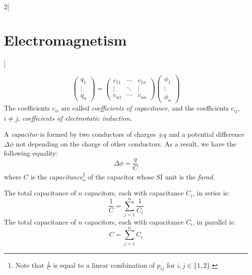\documentclass[../../../main_physics.tex]{subfiles}
\begin{document}
\begin{multicols}{2}[\section{Electromagnetism}]
\begin{definition}
    $$
      \begin{pmatrix}
        q_1    \\
        \vdots \\
        q_n
      \end{pmatrix}=
      \begin{pmatrix}
        c_{11} & \cdots & c_{1n} \\
        \vdots & \ddots & \vdots \\
        c_{n1} & \cdots & c_{nn}
      \end{pmatrix}
      \begin{pmatrix}
        \phi_1 \\
        \vdots \\
        \phi_n
      \end{pmatrix}
    $$
    The coefficients $c_{ii}$ are called \emph{coefficients of capacitance}, and the coefficients $c_{ij}$, $i\ne j$, \emph{coefficients of electrostatic induction}.
  \end{definition}
  \begin{definition}[Capacitor]
    A \emph{capacitor} is formed by two conductors of charges $\pm q$ and a potential difference $\Delta\phi$ not depending on the charge of other conductors. As a result, we have the following equality: $$\Delta\phi=\frac{q}{C}$$ where $C$ is the \emph{capacitance}\footnote{Note that $\frac{1}{C}$ is equal to a linear combination of $p_{ij}$ for $i,j\in\{1,2\}$.} of the capacitor whose SI unit is the \emph{farad}.
  \end{definition}
  \begin{proposition}
    The total capacitance of $n$ capacitors, each with capacitance $C_i$, in series is: $$\frac{1}{C}=\sum_{j=1}^n\frac{1}{C_i}$$
    The total capacitance of $n$ capacitors, each with capacitance $C_i$, in parallel is: $$C=\sum_{j=1}^nC_i$$
  \end{proposition}

\end{multicols}
\end{document}
